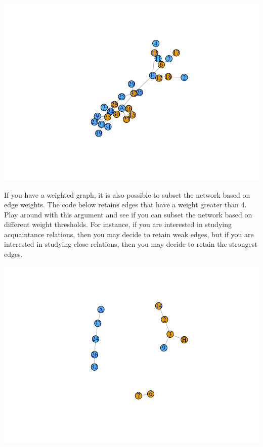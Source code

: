 \documentclass[
]{book}
\newenvironment{Shaded}{\begin{snugshade}}{\end{snugshade}}
\newcommand{\AttributeTok}[1]{\textcolor[rgb]{0.13,0.29,0.53}{#1}}
\newcommand{\DecValTok}[1]{\textcolor[rgb]{0.00,0.00,0.81}{#1}}
\newcommand{\FunctionTok}[1]{\textcolor[rgb]{0.13,0.29,0.53}{\textbf{#1}}}
\newcommand{\NormalTok}[1]{#1}
\newcommand{\OtherTok}[1]{\textcolor[rgb]{0.56,0.35,0.01}{#1}}
\newcommand{\SpecialCharTok}[1]{\textcolor[rgb]{0.81,0.36,0.00}{\textbf{#1}}}
\begin{document}
\includegraphics{bookdown-demo_files/figure-latex/unnamed-chunk-92-1.pdf}

If you have a weighted graph, it is also possible to subset the network based on edge weights. The code below retains edges that have a weight greater than 4. Play around with this argument and see if you can subset the network based on different weight thresholds. For instance, if you are interested in studying acquaintance relations, then you may decide to retain weak edges, but if you are interested in studying close relations, then you may decide to retain the strongest edges.

\begin{Shaded}
\end{Shaded}

\includegraphics{bookdown-demo_files/figure-latex/unnamed-chunk-93-1.pdf}
\end{document}
